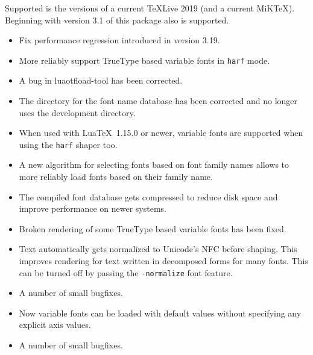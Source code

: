 Supported is the  versions of a current TeXLive 2019 (and a current MiKTeX). Beginning with version 3.1 of this package also  is supported.
\endsection

\begin{itemize}
  \item Fix performance regression introduced in version 3.19.
  \item More reliably support TrueType based variable fonts in \texttt{harf}
    mode.
\end{itemize}
\endsubsection

\begin{itemize}
  \item A bug in luaotfload-tool has been corrected.
  \item The directory for the font name database has been corrected and no
    longer uses the development directory.
\end{itemize}
\endsubsection

\begin{itemize}
  \item When used with Lua\TeX\ 1.15.0 or newer, variable fonts are supported
    when using the \texttt{harf} shaper too.
  \item A new algorithm for selecting fonts based on font family names allows
    to more reliably load fonts based on their family name.
  \item The compiled font database gets compressed to reduce disk space and
    improve performance on newer systems.
  \item Broken rendering of some TrueType based variable fonts has been fixed.
  \item Text automatically gets normalized to Unicode's NFC before shaping.
    This improves rendering for text written in decomposed forms for many
    fonts. This can be turned off by passing the \texttt{-normalize} font
    feature.
  \item A number of small bugfixes.
 \end{itemize}
\endsubsection

\begin{itemize}
  \item Now variable fonts can be loaded with default values without specifying
    any explicit axis values.
  \item A number of small bugfixes.
 \end{itemize}
\endsubsection

